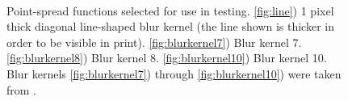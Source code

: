 \documentclass[12pt,notitlepage]{report}
\begin{document}
\begin{figure}[htb]
  \centering
	  ~
	  ~
	  ~
  \caption[Point-spread functions selected for use in testing]{Point-spread functions selected for use in testing. \ref{fig:line}) 1 pixel thick diagonal line-shaped blur kernel (the line shown is thicker in order to be visible in print). \ref{fig:blurkernel7}) Blur kernel 7. \ref{fig:blurkernel8}) Blur kernel 8. \ref{fig:blurkernel10}) Blur kernel 10. Blur kernels \ref{fig:blurkernel7}) through \ref{fig:blurkernel10}) were taken from \cite{yuan07}.}
  \label{fig:used_psfs}
\end{figure}


\end{document}
